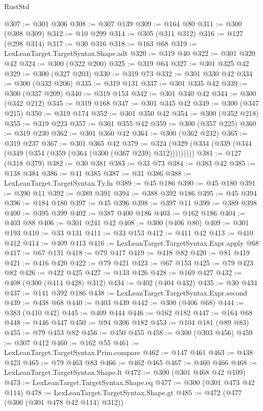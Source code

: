 \begin{lexlean}{RustStd}
\begin{coremodule}
@307 := @301 @306
@308 := @307 @139
@309 := @164 @80
@311 := @300 (@308 @309)
@312 := @10 @299
@314 := @305 (@311 @312)
@316 := @127 (@298 @314)
@317 := @30 @316
@318 := @163 @68
@319 := LexLeanTarget.TargetSyntax.Shape.adt
@320 := @319 @40
@322 := @301 @320 @42
@324 := @300 (@322 @200)
@325 := @319 @64
@327 := @301 @325 @42
@329 := @300 (@327 @203)
@330 := @319 @73
@332 := @301 @330 @42
@334 := @300 (@332 @206)
@335 := @319 @131
@337 := @301 @335 @42
@339 := @300 (@337 @209)
@340 := @319 @153
@342 := @301 @340 @42
@344 := @300 (@342 @212)
@345 := @319 @168
@347 := @301 @345 @42
@349 := @300 (@347 @215)
@350 := @319 @174
@352 := @301 @350 @42
@354 := @300 (@352 @218)
@355 := @319 @223
@357 := @301 @355 @42
@359 := @300 (@357 @225)
@360 := @319 @230
@362 := @301 @360 @42
@364 := @300 (@362 @232)
@365 := @319 @237
@367 := @301 @365 @42
@379 := @324 (@329 (@334 (@339 (@344 (@349 (@354 (@359 (@364 (@300 (@367 @239) @312)))))))))
@381 := @127 (@318 @379)
@382 := @30 @381
@383 := @33 @73
@384 := @383 @42
@385 := @138 @384
@386 := @41 @385
@387 := @31 @386
@388 := LexLeanTarget.TargetSyntax.Ty.fn
@389 := @45 @186
@390 := @45 @180
@391 := @390 @11
@392 := @389 @391
@394 := @388 @392 @186
@395 := @45 @394
@396 := @184 @180
@397 := @45 @396
@398 := @397 @11
@399 := @389 @398
@400 := @395 @399
@402 := @387 @400 @186
@403 := @162 @186
@404 := @403 @88
@406 := @301 @241 @42
@408 := @300 (@406 @80)
@409 := @301 @193
@410 := @33 @131
@411 := @33 @153
@412 := @411 @42
@413 := @410 @412
@414 := @409 @413
@416 := LexLeanTarget.TargetSyntax.Expr.apply @68
@417 := @67 @131
@418 := @79 @417
@419 := @418 @82
@420 := @81 @419
@421 := @416 @420
@422 := @79 @421
@423 := @67 @153
@425 := @79 @423 @82
@426 := @422 @425
@427 := @133 @426
@428 := @169 @427
@432 := @408 (@300 (@414 @428) @312)
@434 := @402 (@404 @432)
@435 := @30 @434
@437 := @141 @392 @186
@438 := LexLeanTarget.TargetSyntax.Expr.second
@439 := @438 @68
@440 := @403 @439
@442 := @300 (@406 @68)
@444 := @383 (@410 @42)
@445 := @409 @444
@446 := @162 @182
@447 := @164 @68
@448 := @446 @447
@450 := @94 @306 @182
@453 := @104 @181 (@89 @83)
@455 := @79 @453 @82
@456 := @450 @455
@458 := @300 (@303 @456)
@459 := @307 @412
@460 := @162 @55
@461 := LexLeanTarget.TargetSyntax.Prim.compare
@462 := @147 @461
@463 := @438 @423
@465 := @79 @463 @83
@466 := @462 @465
@467 := @460 @466
@468 := LexLeanTarget.TargetSyntax.Shape.lt
@472 := @300 (@301 @468 @42 @109)
@473 := LexLeanTarget.TargetSyntax.Shape.eq
@477 := @300 (@301 @473 @42 @114)
@478 := LexLeanTarget.TargetSyntax.Shape.gt
@485 := @472 (@477 (@300 (@301 @478 @42 @114) @312))

\end{coremodule}
\end{lexlean}
